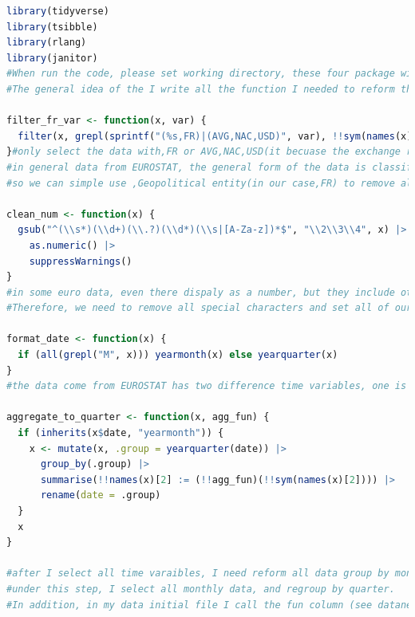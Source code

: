 \documentclass[12pt]{article}
\begin{document}
\begin{lstlisting}[language=R]
library(tidyverse)
library(tsibble)
library(rlang)
library(janitor)
#When run the code, please set working directory, these four package will help me to reform the data
#The general idea of the I write all the function I needed to reform the data, when I use loop import the required file name, variable name and the required formula (sum and mean) one by one 

filter_fr_var <- function(x, var) {
  filter(x, grepl(sprintf("(%s,FR)|(AVG,NAC,USD)", var), !!sym(names(x)[1])))  #remember change the country code if you need another country
}#only select the data with,FR or AVG,NAC,USD(it becuase the exchange rate is by EUR to USD, so EUROSTAT does not label with France.
#in general data from EUROSTAT, the general form of the data is classified by Unit of measure,Statistical classification of economic activities in the European Community,National accounts indicator,Geopolitical entity, 
#so we can simple use ,Geopolitical entity(in our case,FR) to remove all other country data and only keep France data.

clean_num <- function(x) {
  gsub("^(\\s*)(\\d+)(\\.?)(\\d*)(\\s|[A-Za-z])*$", "\\2\\3\\4", x) |>
    as.numeric() |>
    suppressWarnings()
}
#in some euro data, even there dispaly as a number, but they include other special characters and not made as numeric,
#Therefore, we need to remove all special characters and set all of our data as numeric, furthermore, if there as missing variable, we reset them as by NA.

format_date <- function(x) {
  if (all(grepl("M", x))) yearmonth(x) else yearquarter(x)
}
#the data come from EUROSTAT has two difference time variables, one is group by monthly, and other is by quarterly, so we select all the time varible.

aggregate_to_quarter <- function(x, agg_fun) {
  if (inherits(x$date, "yearmonth")) {
    x <- mutate(x, .group = yearquarter(date)) |>
      group_by(.group) |>
      summarise(!!names(x)[2] := (!!agg_fun)(!!sym(names(x)[2]))) |>
      rename(date = .group)
  }
  x
}

#after I select all time varaibles, I need reform all data group by monthly to quarterly and change their name to quarterly
#under this step, I select all monthly data, and regroup by quarter.
#In addition, in my data initial file I call the fun column (see dataneeded.csv for details), and in the third column of that file I call two formulas, mean and sum, so when changing the time variable to quarterly, I also use the function in the third column of dataneeded.csv to change the monthly data according to Request to change to quarterly data using sum or mean. They are done by the function "process_file" 


\end{lstlisting}
\end{document}
